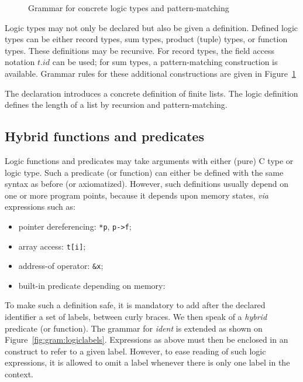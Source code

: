 \begin{figure}[t]
  \begin{cadre}
      
    \end{cadre}
  \caption{Grammar for concrete logic types and pattern-matching}
\label{fig:gram:logictype}
\end{figure}

Logic types may not only be declared but also be given a
definition. Defined logic types can be either record
types, sum
types, product (tuple) types, or function types. These definitions may be recursive.
For record types, the field access notation $t.id$ can be used;
for sum types, a pattern-matching construction is available.
Grammar rules for these additional constructions are given in
Figure~\ref{fig:gram:logictype}

\begin{example}
  The declaration
  introduces a concrete definition of finite lists. The logic definition
  defines the length of a list by recursion and pattern-matching.
\end{example}


\subsection{Hybrid functions and predicates}
\label{sec:logicalstates}

Logic functions and predicates may take arguments with
either (pure) C type or logic
type. Such a predicate (or function)
can either be defined with the same syntax as before (or axiomatized).
However, such definitions usually depend on one or
more program points, because it depends upon memory states, \emph{via}
expressions such as:
\begin{itemize}
\item pointer dereferencing: \lstinline|*p|, \lstinline|p->f|;
\item array access: \lstinline|t[i]|;
\item address-of operator: \lstinline|&x|;
\item built-in predicate depending on memory: \valid
\end{itemize}
To make such a definition safe, it is mandatory to add after the
declared identifier a set of labels, between curly braces. We then speak
of a \textit{hybrid} predicate (or function).
The grammar for \textit{ident} is extended as shown on
Figure~\ref{fig:gram:logiclabels}. Expressions
as above must then be enclosed in an \at{} construct to refer to a
given label. However, to ease reading of such logic expressions, it
is allowed to omit a label whenever there is only one label in the
context.

